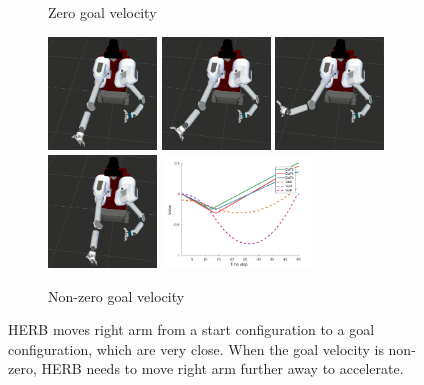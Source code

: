 \documentclass[letterpaper, 10 pt, conference]{ieeeconf}  %
\begin{document}
\begin{figure}[t!]
\begin{subfigure}[b]{\textwidth}
		\caption{Zero goal velocity}
		\label{fig:motivation:slow}
	\end{subfigure}
	\begin{subfigure}[b]{\textwidth}
		\centering
		\includegraphics[height=3cm]{fig/motivation/fast1}
		\includegraphics[height=3cm]{fig/motivation/fast2}
		\includegraphics[height=3cm]{fig/motivation/fast3}
		\includegraphics[height=3cm]{fig/motivation/fast4}
		\includegraphics[height=3cm]{fig/motivation/fastmotion}
		\caption{Non-zero goal velocity}
		\label{fig:motivation:fast}
	\end{subfigure}
	\caption{HERB moves right arm from a start configuration to a goal configuration, which are very close.
    When the goal velocity is non-zero, HERB needs to move right arm further away to accelerate.
	}
	\label{fig:motivation}
\end{figure} 
\end{document}
